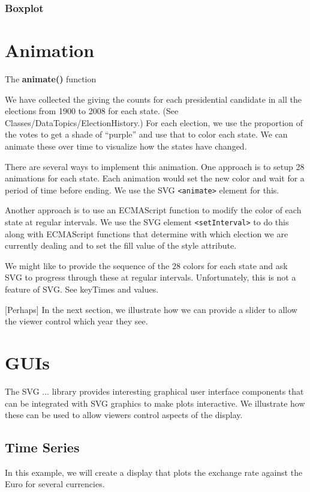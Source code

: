 \documentclass[article]{jss}
\def\Rfunc#1{\textbf{#1()}}
\def\SVGEl#1{\texttt{<#1>}}
\begin{document}
\subsubsection{Boxplot}

\section{Animation}

The \Rfunc{animate} function

We have collected the giving the counts for each presidential
candidate in all the elections from 1900 to 2008 for each state. (See
Classes/DataTopics/ElectionHistory.)  For each election, we use the
proportion of the votes to get a shade of ``purple'' and use that to
color each state.  We can animate these over time to visualize how the
states have changed.

There are several ways to implement this animation.  One approach is
to setup 28 animations for each state.  Each animation would set the
new color and wait for a period of time before ending.  We use the SVG
\SVGEl{animate} element for this.

Another approach is to use an ECMAScript function to modify the color
of each state at regular intervals.  We use the SVG element
\SVGEl{setInterval} to do this along with ECMAScript functions that
determine with which election we are currently dealing and to set the
fill value of the style attribute.

We might like to provide the sequence of the $28$ colors for each
state and ask SVG to progress through these at regular intervals.
Unfortunately, this is not a feature of SVG.
See keyTimes and  values.


[Perhaps] In the next section, we illustrate how we can provide a slider
to allow the viewer control which year they see.



\section{GUIs}
The SVG ... library provides interesting
graphical user interface components that can be 
integrated with SVG graphics to make plots
interactive.
We illustrate how these can be used to 
allow viewers control aspects of the display.

\subsection{Time Series}
In this example, we will create a display that plots the exchange rate
against the Euro for several currencies.
\end{document}
